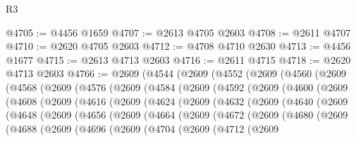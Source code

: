 \begin{lexlean}{R3}
\begin{coremodule}
@4705 := @4456 @1659
@4707 := @2613 @4705 @2603
@4708 := @2611 @4707
@4710 := @2620 @4705 @2603
@4712 := @4708 @4710 @2630
@4713 := @4456 @1677
@4715 := @2613 @4713 @2603
@4716 := @2611 @4715
@4718 := @2620 @4713 @2603
@4766 := @2609
    (@4544
      (@2609
        (@4552
          (@2609
            (@4560
              (@2609
                (@4568
                  (@2609
                    (@4576
                      (@2609
                        (@4584
                          (@2609
                            (@4592
                              (@2609
                                (@4600
                                  (@2609
                                    (@4608
                                      (@2609
                                        (@4616
                                          (@2609
                                            (@4624
                                              (@2609
                                                (@4632
                                                  (@2609
                                                    (@4640
                                                      (@2609
                                                        (@4648
                                                          (@2609
                                                            (@4656
                                                              (@2609
                                                                (@4664
                                                                  (@2609
                                                                    (@4672
                                                                      (@2609
                                                                        (@4680
                                                                          (@2609
                                                                            (@4688
                                                                              (@2609
                                                                                (@4696
                                                                                  (@2609
                                                                                    (@4704
                                                                                      (@2609
                                                                                        (@4712
                                                                                          (@2609

\end{coremodule}
\end{lexlean}
